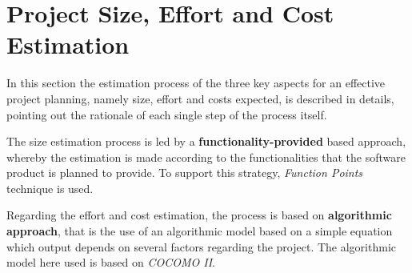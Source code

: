 \section{Project Size, Effort and Cost Estimation}

In this section the estimation process of the three key aspects for an effective project planning, namely size, effort and costs expected, is described in details, pointing out the rationale of each single step of the process itself.

The size estimation process is led by a \textbf{functionality-provided} based approach, whereby the estimation is made according to the functionalities that the software product is planned to provide. To support this strategy, \textit{Function Points} technique is used. 

Regarding the effort and cost estimation, the process is based on \textbf{algorithmic approach}, that is the use of an algorithmic model based on a simple equation which output depends on several factors regarding the project. The algorithmic model here used is based on \textit{COCOMO II}.

	
	
